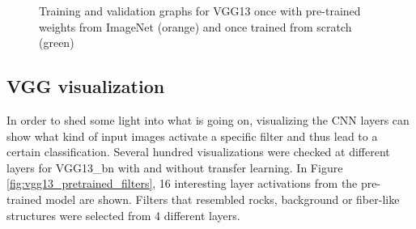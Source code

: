 \begin{figure}[!h]
\centering
\caption{Training and validation graphs for VGG13 once with pre-trained weights from ImageNet (orange) and once trained from scratch (green)}
\label{fig:vgg13-graph}
\end{figure}

\quad

\subsection{VGG visualization}

In order to shed some light into what is going on, visualizing the CNN layers can show what kind of input images activate a specific filter and thus lead to a certain classification. Several hundred visualizations were checked at different layers for VGG13\_bn with and without transfer learning. In Figure \ref{fig:vgg13_pretrained_filters}, 16 interesting layer activations from the pre-trained model are shown. Filters that resembled rocks, background or fiber-like structures were selected from 4 different layers. \\


